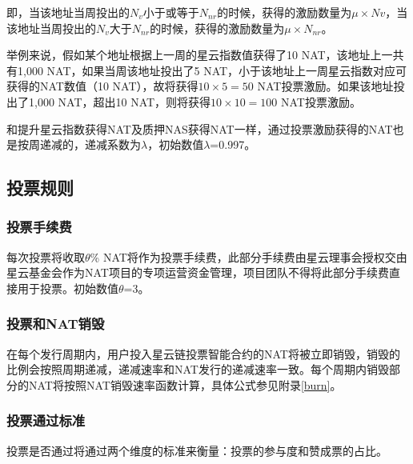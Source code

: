 即，当该地址当周投出的$N_{v}$小于或等于$N_{nr}$的时候，获得的激励数量为$\mu\times Nv$，当该地址当周投出的$N_{v}$大于$N_{nr}$的时候，获得的激励数量为$\mu\times N_{nr}$。

举例来说，假如某个地址根据上一周的星云指数值获得了10 NAT，该地址上一共有1,000 NAT，如果当周该地址投出了5 NAT，小于该地址上一周星云指数对应可获得的NAT数值（10 NAT），故将获得$10\times5=50$ NAT投票激励。如果该地址投出了1,000 NAT，超出10 NAT，则将获得$10\times10=100$ NAT投票激励。

和提升星云指数获得NAT及质押NAS获得NAT一样，通过投票激励获得的NAT也是按周递减的，递减系数为$\lambda$，初始数值$\lambda$=0.997。

\subsection{投票规则}
	
\subsubsection{投票手续费}

每次投票将收取$\theta$\% NAT将作为投票手续费，此部分手续费由星云理事会授权交由星云基金会作为NAT项目的专项运营资金管理，项目团队不得将此部分手续费直接用于投票。初始数值$\theta$=3。

\subsubsection{投票和NAT销毁}

在每个发行周期内，用户投入星云链投票智能合约的NAT将被立即销毁，销毁的比例会按照周期递减，递减速率和NAT发行的递减速率一致。每个周期内销毁部分的NAT将按照NAT销毁速率函数计算，具体公式参见附录\ref{burn}。

\subsubsection{投票通过标准}
	
投票是否通过将通过两个维度的标准来衡量：投票的参与度和赞成票的占比。

